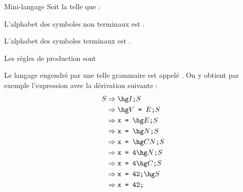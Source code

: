     \begin{example}{Mini-langage}{}
        Soit  la  telle que :
        \begin{enumerate}
            \itt L'alphabet des symboles non terminaux est .
            
            \itt L'alphabet des symboles terminaux est .
            
            \itt Les règles de production sont 
        \end{enumerate}
        Le langage \hg{$\bcL\p{\bcG}$} engendré par une telle grammaire est appelé . On y obtient par exemple l'expression  avec la dérivation suivante :
        \begin{align*}
            S &\Rightarrow \hg I\texttt{;}S\\
            &\Rightarrow \hg V\texttt{ = }E\texttt{;}S\\
            &\Rightarrow \texttt{x = }\hg E\texttt{;}S\\
            &\Rightarrow \texttt{x = }\hg N\texttt{;}S\\
            &\Rightarrow \texttt{x = }\hg CN\texttt{;}S\\
            &\Rightarrow \texttt{x = 4}\hg N\texttt{;}S\\
            &\Rightarrow \texttt{x = 4}\hg C\texttt{;}S\\
            &\Rightarrow \texttt{x = 42;}\hg S\\
            &\Rightarrow \texttt{x = 42;}
        \end{align*}
    \end{example}
    
